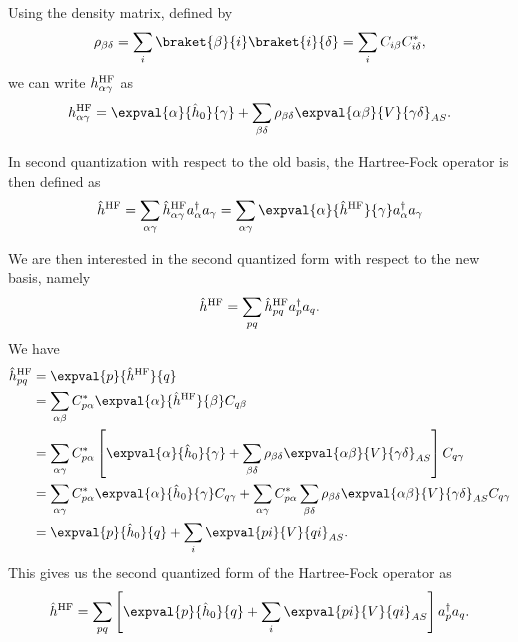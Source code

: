 Using the density matrix, defined by
\begin{equation*}
    \rho_{\beta\delta} = \sum_{i} \braket{\beta}{i} \braket{i}{\delta} = \sum_{i} C_{i\beta} C_{i\delta}^*,
\end{equation*}
we can write $h_{\alpha \gamma}^{\mathrm{HF}}$ as
\begin{equation*}
    h_{\alpha \gamma}^\HF = \expval{\alpha}{\hat{h}_0}{\gamma} + \sum_{\beta\delta} \rho_{\beta\delta} \expval{\alpha\beta}{V}{\gamma\delta}_{AS}.
\end{equation*}

In second quantization with respect to the old basis, the Hartree-Fock operator is then defined as
\begin{equation*}
    \hat{h}^\HF = \sum_{\alpha \gamma} \hat{h}^\HF_{\alpha\gamma} a_\alpha^\dagger a_\gamma = \sum_{\alpha \gamma} \expval{\alpha}{\hat{h}^\HF}{\gamma} a_\alpha^\dagger a_\gamma
\end{equation*}

We are then interested in the second quantized form with respect to the new basis, namely
\begin{equation*}
    \hat{h}^{\mathrm{HF}} = \sum_{pq} \hat{h}^{\mathrm{HF}}_{p q} a_p^\dagger a_q.
\end{equation*}
We have
\begin{align*}
    \hat{h}^\HF_{p q} &= \expval{p}{\hat{h}^\HF}{q} \\
    &= \sum_{\alpha \beta} C_{p \alpha}^* \expval{\alpha}{\hat{h}^\HF}{\beta} C_{q \beta} \\
    &= \sum_{\alpha\gamma} C_{p\alpha}^* \left[ \expval{\alpha}{\hat{h}_0}{\gamma} + \sum_{\beta\delta} \rho_{\beta\delta} \expval{\alpha\beta}{V}{\gamma\delta}_{AS} \right] C_{q\gamma} \\
    &= \sum_{\alpha\gamma} C_{p\alpha}^* \expval{\alpha}{\hat{h}_0}{\gamma} C_{q\gamma} + \sum_{\alpha\gamma} C_{p\alpha}^* \sum_{\beta\delta} \rho_{\beta\delta} \expval{\alpha\beta}{V}{\gamma\delta}_{AS} C_{q\gamma} \\
    &= \expval{p}{\hat{h}_0}{q} + \sum_{i} \expval{p i }{V}{q i}_{AS}.
\end{align*}
This gives us the second quantized form of the Hartree-Fock operator as
\begin{equation*}
    \hat{h}^\HF = \sum_{pq} \left[ \expval{p}{\hat{h}_0}{q} + \sum_{i} \expval{pi}{V}{qi}_{AS} \right] a_p^\dagger a_q.
\end{equation*}

